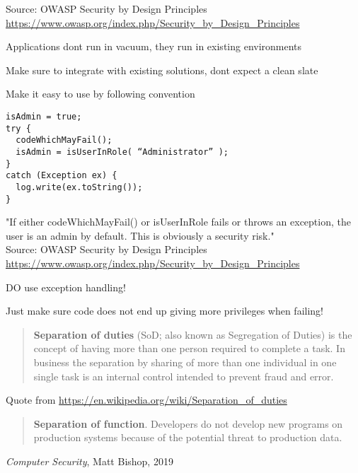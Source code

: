 \documentclass[Screen16to9,17pt]{foils}
\begin{document}
Source: OWASP Security by Design Principles\\
\url{https://www.owasp.org/index.php/Security_by_Design_Principles}

\begin{list2}
\item Applications dont run in vacuum, they run in existing environments
\item Make sure to integrate with existing solutions, dont expect a clean slate
\item Make it easy to use by following convention
\end{list2}


\begin{verbatim}
isAdmin = true;
try {
  codeWhichMayFail();
  isAdmin = isUserInRole( “Administrator” );
}
catch (Exception ex) {
  log.write(ex.toString());
}
\end{verbatim}
"If either codeWhichMayFail() or isUserInRole fails or throws an exception, the user is an admin by default. This is obviously a security risk."\\
Source: OWASP Security by Design Principles\\
\url{https://www.owasp.org/index.php/Security_by_Design_Principles}

\begin{list2}
\item DO use exception handling!
\item Just make sure code does not end up giving more privileges when failing!
\end{list2}


\begin{quote}
{\bf Separation of duties} (SoD; also known as Segregation of Duties) is the concept of having more than one person required to complete a task. In business the separation by sharing of more than one individual in one single task is an internal control intended to prevent fraud and error.
\end{quote}

Quote from \url{https://en.wikipedia.org/wiki/Separation_of_duties}

\begin{quote}
{\bf Separation of function}. Developers do not develop new programs on production systems because of the potential threat to production data.
\end{quote}
\emph{Computer Security}, Matt Bishop, 2019
\end{document}
